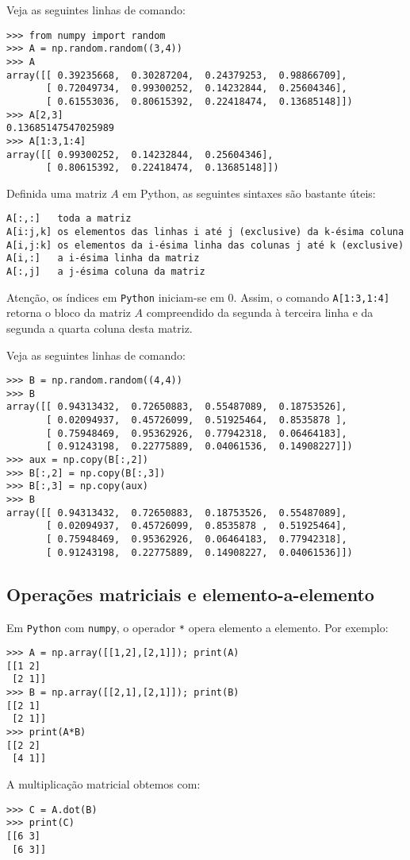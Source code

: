 \begin{ex}
  Veja as seguintes linhas de comando:
\begin{verbatim}
>>> from numpy import random
>>> A = np.random.random((3,4))
>>> A
array([[ 0.39235668,  0.30287204,  0.24379253,  0.98866709],
       [ 0.72049734,  0.99300252,  0.14232844,  0.25604346],
       [ 0.61553036,  0.80615392,  0.22418474,  0.13685148]])
>>> A[2,3]
0.13685147547025989
>>> A[1:3,1:4]
array([[ 0.99300252,  0.14232844,  0.25604346],
       [ 0.80615392,  0.22418474,  0.13685148]])
\end{verbatim}
\end{ex}

Definida uma matriz $A$ em Python, as seguintes sintaxes são bastante úteis:
\begin{verbatim}
A[:,:]   toda a matriz
A[i:j,k] os elementos das linhas i até j (exclusive) da k-ésima coluna
A[i,j:k] os elementos da i-ésima linha das colunas j até k (exclusive)
A[i,:]   a i-ésima linha da matriz
A[:,j]   a j-ésima coluna da matriz
\end{verbatim}

Atenção, os índices em \verb+Python+ iniciam-se em $0$. Assim, o comando \verb+A[1:3,1:4]+ retorna o bloco da matriz $A$ compreendido da segunda à terceira linha e da segunda a quarta coluna desta matriz.

\begin{ex}
Veja as seguintes linhas de comando:
\begin{verbatim}
>>> B = np.random.random((4,4))
>>> B
array([[ 0.94313432,  0.72650883,  0.55487089,  0.18753526],
       [ 0.02094937,  0.45726099,  0.51925464,  0.8535878 ],
       [ 0.75948469,  0.95362926,  0.77942318,  0.06464183],
       [ 0.91243198,  0.22775889,  0.04061536,  0.14908227]])
>>> aux = np.copy(B[:,2])
>>> B[:,2] = np.copy(B[:,3])
>>> B[:,3] = np.copy(aux)
>>> B
array([[ 0.94313432,  0.72650883,  0.18753526,  0.55487089],
       [ 0.02094937,  0.45726099,  0.8535878 ,  0.51925464],
       [ 0.75948469,  0.95362926,  0.06464183,  0.77942318],
       [ 0.91243198,  0.22775889,  0.14908227,  0.04061536]])
\end{verbatim}
\end{ex}

\subsection{Operações matriciais e elemento-a-elemento}

Em \verb+Python+ com \verb+numpy+, o operador \verb+*+ opera elemento a elemento. Por exemplo:
\begin{verbatim}
>>> A = np.array([[1,2],[2,1]]); print(A)
[[1 2]
 [2 1]]
>>> B = np.array([[2,1],[2,1]]); print(B)
[[2 1]
 [2 1]]
>>> print(A*B)
[[2 2]
 [4 1]]
\end{verbatim}
A multiplicação matricial obtemos com:
\begin{verbatim}
>>> C = A.dot(B)
>>> print(C)
[[6 3]
 [6 3]]
\end{verbatim}

